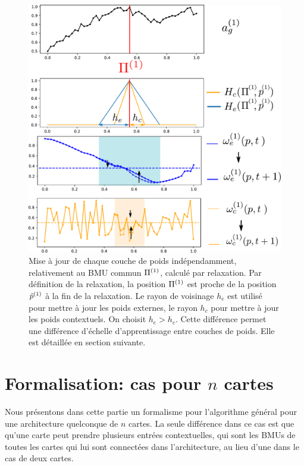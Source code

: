 \begin{figure}
\begin{minipage}[c]{0.6\textwidth}
\includegraphics[width=\textwidth]{maj_2som.pdf}
\end{minipage}
\hfill
\begin{minipage}[c]{0.35\textwidth}
\caption{Mise à jour de chaque couche de poids indépendamment, relativement au BMU commun $\Pi^{({1})}$, calculé par relaxation. Par définition de la relaxation, la position $\Pi^{({1})}$ est proche de la position $\hat{p}^{({1})}$ à la fin de la relaxation. Le rayon de voisinage $h_e$ est utilisé pour mettre à jour les poids externes, le rayon $h_c$ pour mettre à jour les poids contextuels. On choisit $h_e > h_c$. Cette différence permet une différence d'échelle d'apprentissage entre couches de poids. Elle est détaillée en section suivante.}
\end{minipage}
\label{lig:maj}
\end{figure}

\section{Formalisation: cas pour $n$ cartes}
Nous présentons dans cette partie un formalisme pour l'algorithme général pour une architecture quelconque de $n$ cartes. La seule différence dans ce cas est que qu'une carte peut prendre plusieurs entrées contextuelles, qui sont les BMUs de toutes les cartes qui lui sont connectées dans l'architecture, au lieu d'une dans le cas de deux cartes. 

